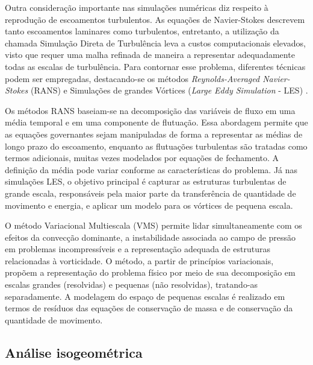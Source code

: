 Outra consideração importante nas simulações numéricas diz respeito à reprodução de escoamentos turbulentos. As equações de Navier-Stokes descrevem tanto escoamentos laminares como turbulentos, entretanto, a utilização da chamada Simulação Direta de Turbulência leva a custos computacionais elevados, visto que requer uma malha refinada de maneira a representar adequadamente todas as escalas de turbulência. Para contornar esse problema, diferentes técnicas podem ser empregadas, destacando-se os métodos \textit{Reynolds-Averaged Navier-Stokes} (RANS) \cite{Alfonsi2009,Speziale1991} e Simulações de grandes Vórtices (\textit{Large Eddy Simulation} - LES) \cite{Germano1991,LaunderS:1972,PIOMELLI1999,Wilcox:1993}.

Os métodos RANS baseiam-se na decomposição das variáveis de fluxo em uma média temporal e em uma componente de flutuação. Essa abordagem permite que as equações governantes sejam manipuladas de forma a representar as médias de longo prazo do escoamento, enquanto as flutuações turbulentas são tratadas como termos adicionais, muitas vezes modelados por equações de fechamento. A definição da média pode variar conforme as características do problema. Já nas simulações LES, o objetivo principal é capturar as estruturas turbulentas de grande escala, responsáveis pela maior parte da transferência de quantidade de movimento e energia, e aplicar um modelo para os vórtices de pequena escala.

O método Variacional Multiescala (VMS) \cite{BazilevsTT:2013a,Hughes:1995,Hughesetal:1998,Hughesetal:2001} permite lidar simultaneamente com os efeitos da convecção dominante, a instabilidade associada ao campo de pressão em problemas incompressíveis e a representação adequada de estruturas relacionadas à vorticidade. O método, a partir de princípios variacionais, propõem a representação do problema físico por meio de sua decomposição em escalas grandes (resolvidas) e pequenas (não resolvidas), tratando-as separadamente.  A modelagem do espaço de pequenas escalas é realizado em termos de resíduos das equações de conservação de massa e de conservação da quantidade de movimento. 


\subsection{Análise isogeométrica}
\label{AIGsection}

